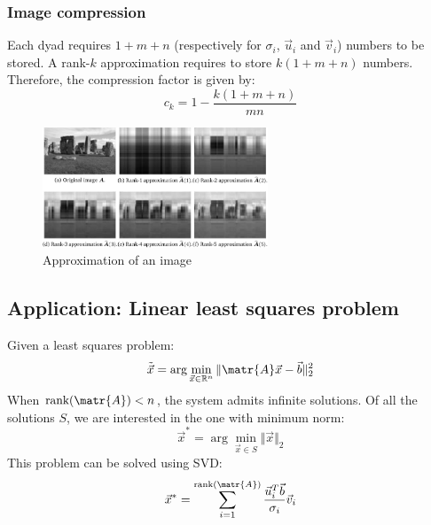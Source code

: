 \subsubsection{Image compression}
Each dyad requires $1 + m + n$ (respectively for $\sigma_i$, $\vec{u}_i$ and $\vec{v}_i$) numbers to be stored.
A rank-$k$ approximation requires to store $k(1 + m + n)$ numbers.
Therefore, the compression factor is given by: 
\[
    c_k = 1 - \frac{k(1 + m + n)}{mn}
\]

\begin{figure}[h]
    \centering
    \includegraphics[width=0.60\textwidth]{img/_rank_k_approx.pdf}
    \caption{Approximation of an image}
\end{figure}



\subsection{Application: Linear least squares problem} \label{sec:lls}
Given a least squares problem:
\[ 
    \tilde{\vec{x}} = \arg\min_{\vec{x} \in \mathbb{R}^n} \Vert \matr{A}\vec{x} - \vec{b} \Vert_2^2
\]
When $\text{rank}(\matr{A}) < n$, the system admits infinite solutions.
Of all the solutions $S$, we are interested in the one with minimum norm:
\[ \vec{x}^* = \arg\min_{\vec{x} \in S} \Vert \vec{x} \Vert_2 \]
This problem can be solved using SVD:
\[ \vec{x}^* = \sum_{i=1}^{\text{rank}(\matr{A})} \frac{\vec{u}_i^T\vec{b}}{\sigma_i}\vec{v}_i \]


